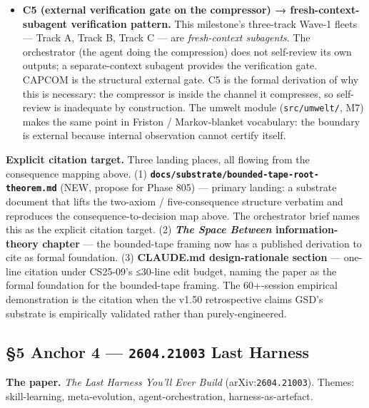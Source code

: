 \documentclass[11pt,letterpaper]{article}
\newcommand{\arxivid}[1]{\texttt{\textcolor{accent}{#1}}}
\begin{document}
\begin{itemize}
  analogical.
\item
  \textbf{C5 (external verification gate on the compressor) →
  fresh-context-subagent verification pattern.} This milestone's
  three-track Wave-1 fleets --- Track A, Track B, Track C --- are
  \emph{fresh-context subagents}. The orchestrator (the agent doing the
  compression) does not self-review its own outputs; a separate-context
  subagent provides the verification gate. CAPCOM is the structural
  external gate. C5 is the formal derivation of why this is necessary:
  the compressor is inside the channel it compresses, so self-review is
  inadequate by construction. The umwelt module (\texttt{src/umwelt/},
  M7) makes the same point in Friston / Markov-blanket vocabulary: the
  boundary is external because internal observation cannot certify
  itself.
\end{itemize}

\textbf{Explicit citation target.} Three landing places, all flowing
from the consequence mapping above. (1)
\textbf{\texttt{docs/substrate/bounded-tape-root-theorem.md}} (NEW,
propose for Phase 805) --- primary landing: a substrate document that
lifts the two-axiom / five-consequence structure verbatim and reproduces
the consequence-to-decision map above. The orchestrator brief names this
as the explicit citation target. (2) \textbf{\emph{The Space Between}
information-theory chapter} --- the bounded-tape framing now has a
published derivation to cite as formal foundation. (3) \textbf{CLAUDE.md
design-rationale section} --- one-line citation under CS25-09's ≤30-line
edit budget, naming the paper as the formal foundation for the
bounded-tape framing. The 60+-session empirical demonstration is the
citation when the v1.50 retrospective claims GSD's substrate is
empirically validated rather than purely-engineered.

\subsection{\texorpdfstring{§5 Anchor 4 --- \arxivid{2604.21003} Last
Harness}{§5 Anchor 4 --- \arxivid{2604.21003} Last Harness}}

\textbf{The paper.} \emph{The Last Harness You'll Ever Build}
(arXiv:\arxivid{2604.21003}). Themes: skill-learning, meta-evolution,
agent-orchestration, harness-as-artefact.
\end{document}
